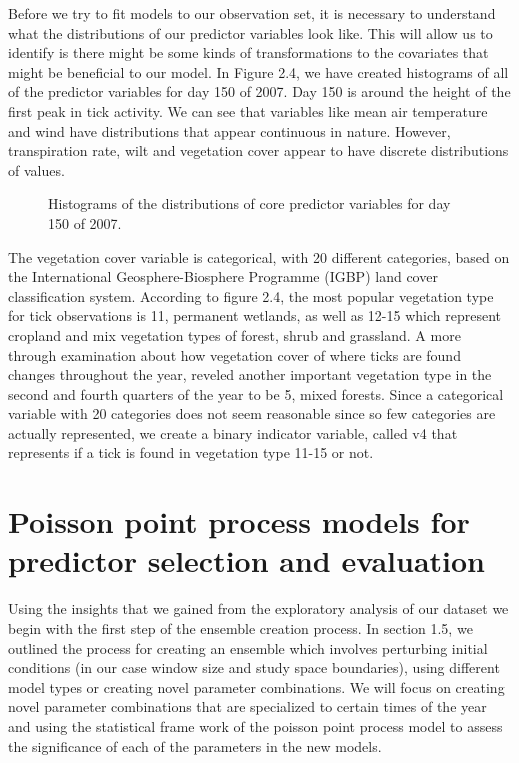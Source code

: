 Before we try to fit models to our observation set, it is necessary to understand what the distributions of our predictor variables look like. This will allow us to identify is there might be some kinds of transformations to the covariates that might be beneficial to our model. In Figure 2.4, we have created histograms of all of the predictor variables for day 150 of 2007. Day 150 is around the height of the first peak in tick activity. We can see that variables like mean air temperature and wind have distributions that appear continuous in nature. However, transpiration rate, wilt and vegetation cover appear to have discrete distributions of values. 

\begin{figure} [!ht]
\centerline{}
\caption{Histograms of the distributions of core predictor  variables for day 150 of 2007. }
\label{fig6}
\end{figure}

\noindent The vegetation cover variable is categorical, with 20 different categories, based on the International Geosphere-Biosphere Programme (IGBP) land cover classification system. According to figure 2.4, the most popular vegetation type for tick observations is 11, permanent wetlands, as well as 12-15 which represent cropland and mix vegetation types of forest, shrub and grassland. A more through examination about how vegetation cover of where ticks are found changes throughout the year, reveled another important vegetation type in the second and fourth quarters of the year to be 5, mixed forests. Since a categorical variable with 20 categories does not seem reasonable since so few categories are actually represented, we create a binary indicator variable, called v4 that represents if a tick is found in vegetation type 11-15 or not. 


\section{Poisson point process models for predictor selection and evaluation}

Using the insights that we gained from the exploratory analysis of our dataset we begin with the first step of the ensemble creation process. In section 1.5, we outlined the process for creating an ensemble which involves perturbing initial conditions (in our case window size and study space boundaries), using different model types or creating novel parameter combinations. We will focus on creating novel parameter combinations that are specialized to certain times of the year and using the statistical frame work of the poisson point process model to assess the significance of each of the parameters in the new models. \newline

